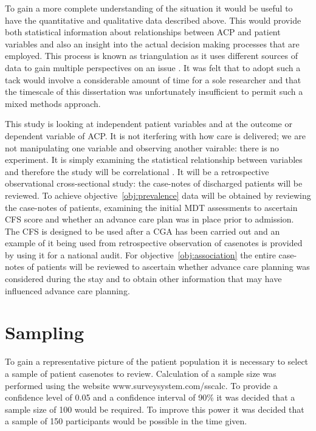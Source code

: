 \documentclass
[
	12pt,
	a4paper,
	oneside,
]{report}
\begin{document}
To gain a more complete understanding of the situation it would be useful to 
have the quantitative and qualitative data described above. This would provide
both statistical information about relationships between ACP and patient
variables and also an insight into the actual decision making processes
that are employed. This process is known as triangulation as it uses different
sources of data to gain multiple perspectives on an issue 
\parencite{biggam:15}. It was felt that to adopt such a tack would involve a 
considerable amount of time for a sole researcher and that the timescale of 
this dissertation was unfortunately insufficient to permit such a mixed 
methods approach.

This study is looking at independent patient variables and at the outcome or
dependent variable 
of ACP. It is not iterfering with how care is delivered; we are not 
manipulating one
variable and observing another vairable: there is no experiment.
It is simply examining the statistical relationship between variables and
therefore the 
study will be correlational \parencite{field:09}. It will be a retrospective 
observational 
cross-sectional study: the case-notes of discharged patients will be reviewed.
To achieve objective~\ref{obj:prevalence} data will be obtained by reviewing 
the case-notes of patients, examining the initial MDT assessments to ascertain 
CFS score and whether an advance care plan was in place prior to admission. The
CFS is designed to be used after a CGA has been carried out \parencite{bgs:14}
and an example of it being used from retrospective observation of casenotes is
provided by \textcite{subbe:13} using it for a national audit.
For objective~\ref{obj:association} the entire case-notes of patients 
will be reviewed to ascertain whether advance care planning was considered 
during the stay and to obtain other information that may have influenced
advance care planning.

\section{Sampling}

To gain a representative picture of the patient population it is necessary
to select a sample of patient casenotes to review. Calculation of a sample size 
was performed using the website www.surveysystem.com/sscalc. To provide a confidence
level of 0.05 and a confidence interval of 90\% it was decided that a sample 
size of 100 would be required. To improve this power it was decided that a sample
of 150 participants would be possible in the time given.
\end{document}
